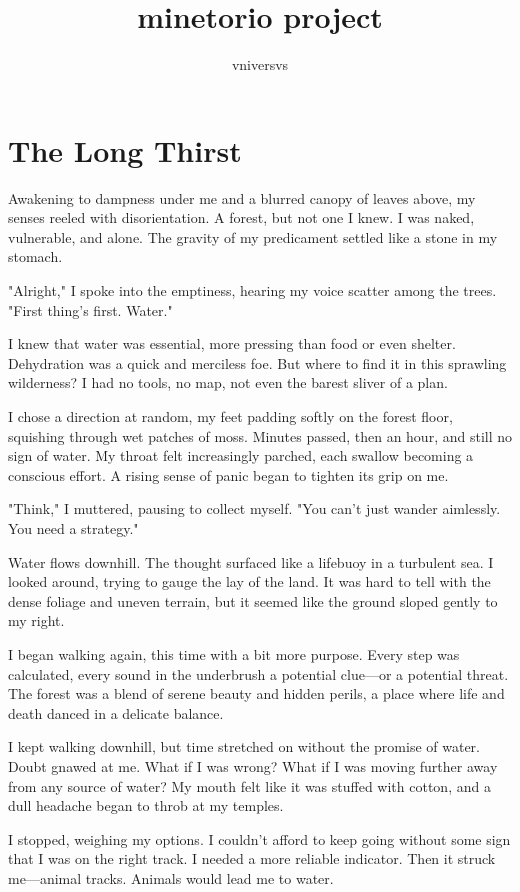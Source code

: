 \documentclass[]{article}
\title{minetorio project}
\author{vniversvs}
\begin{document}
\maketitle

\section{The Long Thirst}

Awakening to dampness under me and a blurred canopy of leaves above, my senses reeled with disorientation. A forest, but not one I knew. I was naked, vulnerable, and alone. The gravity of my predicament settled like a stone in my stomach.

"Alright," I spoke into the emptiness, hearing my voice scatter among the trees. "First thing's first. Water."

I knew that water was essential, more pressing than food or even shelter. Dehydration was a quick and merciless foe. But where to find it in this sprawling wilderness? I had no tools, no map, not even the barest sliver of a plan.

I chose a direction at random, my feet padding softly on the forest floor, squishing through wet patches of moss. Minutes passed, then an hour, and still no sign of water. My throat felt increasingly parched, each swallow becoming a conscious effort. A rising sense of panic began to tighten its grip on me.

"Think," I muttered, pausing to collect myself. "You can't just wander aimlessly. You need a strategy."

Water flows downhill. The thought surfaced like a lifebuoy in a turbulent sea. I looked around, trying to gauge the lay of the land. It was hard to tell with the dense foliage and uneven terrain, but it seemed like the ground sloped gently to my right.

I began walking again, this time with a bit more purpose. Every step was calculated, every sound in the underbrush a potential clue—or a potential threat. The forest was a blend of serene beauty and hidden perils, a place where life and death danced in a delicate balance.

I kept walking downhill, but time stretched on without the promise of water. Doubt gnawed at me. What if I was wrong? What if I was moving further away from any source of water? My mouth felt like it was stuffed with cotton, and a dull headache began to throb at my temples.

I stopped, weighing my options. I couldn't afford to keep going without some sign that I was on the right track. I needed a more reliable indicator. Then it struck me—animal tracks. Animals would lead me to water.
\end{document}
